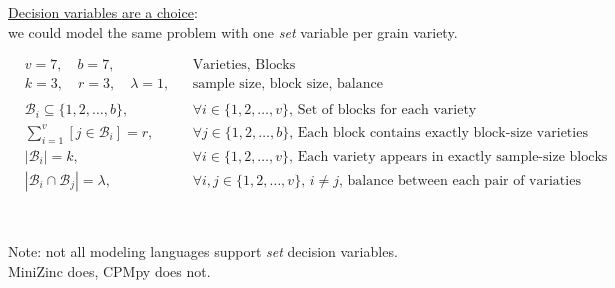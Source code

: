 \documentclass{cons-beamer}
\begin{document}
\begin{frame}
  \underline{Decision variables are a choice}: \\
  we could model the same problem with one \textit{set} variable per grain variety.\\
  
\begin{example}
\footnotesize
\vspace{-1em}
\begin{align}
&v = 7, \quad b = 7, &&\mbox{Varieties, Blocks} \\
&k = 3, \quad r = 3, \quad \lambda = 1, &&\mbox{sample size, block size, balance} \\
\\
&\mathcal{B}_i \subseteq \{1, 2, \dots, b\}, \quad &&\forall i \in \{1, 2, \dots, v\}, \, \mbox{Set of blocks for each variety} \\
&\sum_{i=1}^v [j \in \mathcal{B}_i] = r, \quad &&\forall j \in \{1, 2, \dots, b\}, \, \mbox{Each block contains exactly block-size varieties} \\
&|\mathcal{B}_i| = k, \quad &&\forall i \in \{1, 2, \dots, v\}, \, \mbox{Each variety appears in exactly sample-size blocks} \\
&|\mathcal{B}_i \cap \mathcal{B}_j| = \lambda, \quad &&\forall i, j \in \{1, 2, \dots, v\}, \, i \neq j, \, \mbox{balance between each pair of variaties}
\end{align}
\end{example}

$ $

\alert{Note}: not all modeling languages support \textit{set} decision variables. \\
MiniZinc does, CPMpy does not.
\end{frame}

\begin{flashcardminizinc}
\begin{frame}[fragile]
  \begin{example}
    \footnotesize
  \end{example}
  \begin{example}
    \footnotesize
  \end{example}
\end{frame}
\end{flashcardminizinc}
\end{document}
